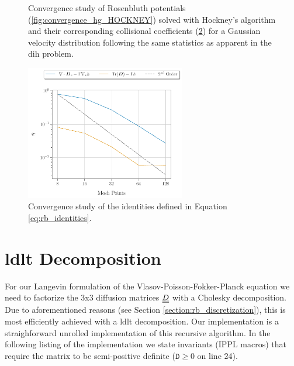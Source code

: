 \begin{figure}[h]
\begin{subfigure}[b]{0.50\textwidth}
    \caption{}
    \label{fig:convergence_DFd_HOCKNEY}
  \end{subfigure}
  \caption{Convergence study of Rosenbluth potentials (\ref{fig:convergence_hg_HOCKNEY}) solved with Hockney's
      algorithm and their corresponding collisional coefficients (\ref{fig:convergence_DFd_HOCKNEY}) for a 
  Gaussian velocity distribution following the same statistics as apparent in the \gls{dih} problem.}
\end{figure}

\begin{figure}
    \begin{center}
        \includegraphics[width=0.62\textwidth]{figures/appendix/convergenceStudy/identities_convergence_sigma005vmax_HOCKNEY.pdf}
    \end{center}
    \caption{Convergence study of the identities defined in Equation \ref{eq:rb_identities}.}
    \label{fig:meshsize_test_HOCKNEY}
\end{figure}

\clearpage
\chapter{\gls{ldlt} Decomposition}
\label{appendix:LDLT}

For our Langevin formulation of the Vlasov-Poisson-Fokker-Planck equation we need to factorize the
3x3 diffusion matrices $\underline{\underline{D}}$ with a Cholesky decomposition.
Due to aforementioned reasons (see Section \ref{section:rb_discretization}), this is most efficiently
achieved with a \gls{ldlt} decomposition.
Our implementation is a straighforward unrolled implementation of this recursive algorithm.
In the following listing of the implementation we state invariants (IPPL macros) that require the matrix to be
semi-positive definite ($\texttt{D} \ge 0$ on line 24).

